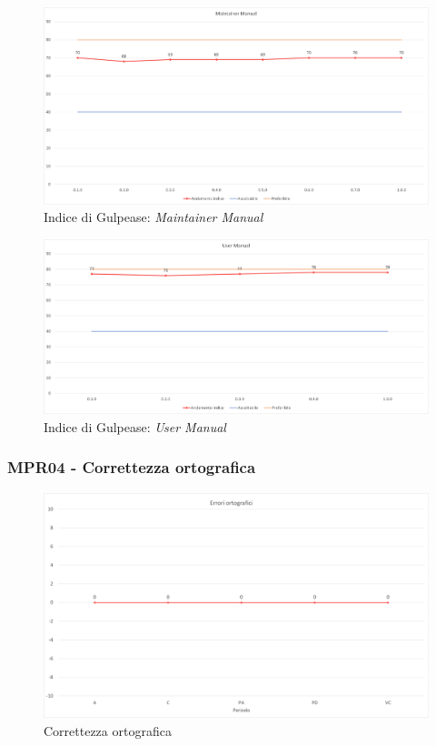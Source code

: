 \begin{figure}[!ht]
    \caption{Indice di Gulpease: \textit{Maintainer Manual}}
    \vspace{10px}
    \includegraphics[scale=0.5]{sezioni/immagini/MaintainerManualGulpease.png}
    \centering
\end{figure}
\pagebreak
\begin{figure}[!ht]
    \caption{Indice di Gulpease: \textit{User Manual}}
    \vspace{10px}
    \includegraphics[scale=0.5]{sezioni/immagini/UserManualGulpease.png}
    \centering
\end{figure}
\pagebreak
\subsubsection{MPR04 - Correttezza ortografica}
\begin{figure}[!ht]
    \caption{Correttezza ortografica}
    \vspace{10px}
    \includegraphics[scale=0.5]{sezioni/immagini/CorrettezzaOrtografica.png}
    \centering
\end{figure}
